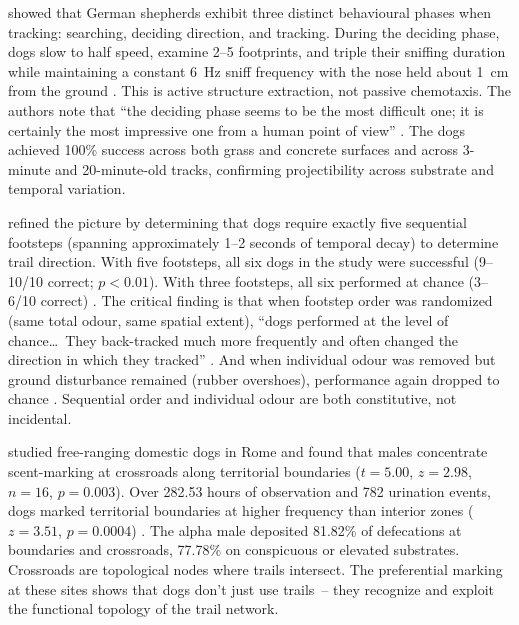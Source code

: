 \documentclass[12pt]{article}
\begin{document}
\textcite{thesen1993} showed that German shepherds exhibit three distinct behavioural phases when tracking: searching, deciding direction, and tracking. During the deciding phase, dogs slow to half speed, examine 2--5 footprints, and triple their sniffing duration while maintaining a constant 6~Hz sniff frequency with the nose held about 1~cm from the ground \citep[250--251]{thesen1993}. This is active structure extraction, not passive chemotaxis. The authors note that \enquote{the deciding phase seems to be the most difficult one; it is certainly the most impressive one from a human point of view} \citep[251]{thesen1993}. The dogs achieved 100\% success across both grass and concrete surfaces and across 3-minute and 20-minute-old tracks, confirming projectibility across substrate and temporal variation.

\textcite{hepper2005} refined the picture by determining that dogs require exactly five sequential footsteps (spanning approximately 1--2 seconds of temporal decay) to determine trail direction. With five footsteps, all six dogs in the study were successful (9--10/10 correct; $p < 0.01$). With three footsteps, all six performed at chance (3--6/10 correct) \citep[296--297]{hepper2005}. The critical finding is that when footstep order was randomized (same total odour, same spatial extent), \enquote{dogs performed at the level of chance\ldots\ They back-tracked much more frequently and often changed the direction in which they tracked} \citep[294]{hepper2005}. And when individual odour was removed but ground disturbance remained (rubber overshoes), performance again dropped to chance \citep[295]{hepper2005}. Sequential order and individual odour are both constitutive, not incidental.

\textcite{cafazzo2012} studied free-ranging domestic dogs in Rome and found that males concentrate scent-marking at crossroads along territorial boundaries ($t = 5.00$, $z = 2.98$, $n = 16$, $p = 0.003$). Over 282.53 hours of observation and 782 urination events, dogs marked territorial boundaries at higher frequency than interior zones ($z = 3.51$, $p = 0.0004$) \citep[960]{cafazzo2012}. The alpha male deposited 81.82\% of defecations at boundaries and crossroads, 77.78\% on conspicuous or elevated substrates. Crossroads are topological nodes where trails intersect. The preferential marking at these sites shows that dogs don't just use trails~-- they recognize and exploit the functional topology of the trail network.
\end{document}
